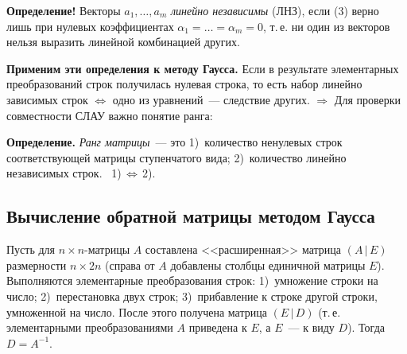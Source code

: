 \documentclass[a4paper,11pt]{article}
\begin{document}
\begin{opr}
\textbf{Определение!} Векторы $a_1,\dots,a_m$ \emph{линейно независимы} (ЛНЗ), если (3) верно лишь
при нулевых коэффициентах $\alpha_1=\dots=\alpha_m=0$, т.\,е. ни один из векторов нельзя выразить
линейной комбинацией других.
\end{opr}

\textbf{Применим эти определения к методу Гаусса.} Если в результате элементарных преобразований строк
получилась нулевая строка, то есть набор линейно зависимых строк $\iff$ одно из уравнений~---
следствие других. $\Rightarrow$ Для проверки совместности СЛАУ важно понятие ранга:
\begin{opr}
\textbf{Определение.} \emph{Ранг матрицы}~--- это
1)~количество ненулевых строк соответствующей матрицы ступенчатого вида;
2)~количество линейно независимых строк. \ 1)\,$\iff$\,2).
\end{opr}

\subsection{Вычисление обратной матрицы методом Гаусса}\label{ssec:obrgauss}
Пусть для $n\times n$-матрицы $A$ составлена <<расширенная>> матрица $(A\,|\,E)$ размерности
$n\times 2n$ (справа от $A$ добавлены столбцы единичной матрицы $E$). Выполняются элементарные
преобразования строк:
1)~умножение строки на число; 2)~перестановка двух строк; 3)~прибавление к строке другой строки,
умноженной на число. После этого получена матрица $(E\,|\,D)$ (т.\,е. элементарными
преобразованиями $A$ приведена к $E$, а $E$~--- к виду $D$). Тогда $D=A^{-1}$.
\end{document}
